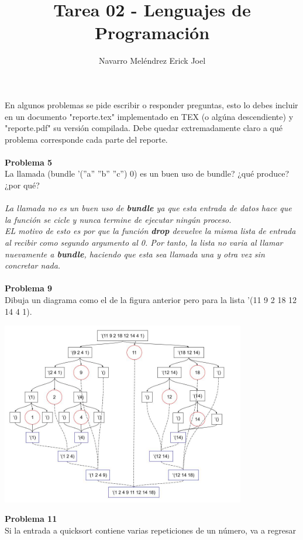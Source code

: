 \documentclass[14pt]{article}
\title{\textbf{Tarea 02 - Lenguajes de Programación}}
\author{Navarro Meléndrez Erick Joel}
\begin{document}
	\maketitle
	En algunos problemas se pide escribir o responder preguntas, esto lo debes incluir en un documento "reporte.tex" implementado en TEX (o algúna descendiente) y "reporte.pdf" su versión compilada. Debe quedar extremadamente claro a qué problema corresponde cada parte del reporte.
	\\
	\\
	{\large\textbf{Problema 5}}
	\\ La llamada (bundle ’(”a” ”b” ”c”) 0) es un buen uso de bundle? ¿qué produce?
	¿por qué?
	\\
	\\\textit{La llamada no es un buen uso de \textbf{bundle} ya que esta entrada de datos hace que la función se cicle y nunca termine de ejecutar ningún proceso.
		\\EL motivo de esto es por que la función \textbf{drop} devuelve la misma lista de entrada al recibir como segundo argumento al 0. Por tanto, la lista no varia al llamar nuevamente a \textbf{bundle}, haciendo que esta sea llamada una y otra vez sin concretar nada.}
	\\
	\\{\large\textbf{Problema 9}}
	\\ Dibuja un diagrama como el de la figura anterior pero para la lista ’(11 9 2 18 12
	14 4 1).
	\\
	\begin{center}
		\includegraphics[width=0.8\textwidth]{Problema9}
	\end{center}
	{\large\textbf{Problema 11}}
	\\ Si la entrada a quicksort contiene varias repeticiones de un número, va a regresar
\end{document}
